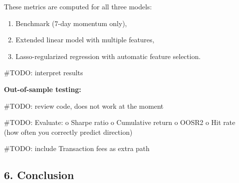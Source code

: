 \documentclass[
  12pt,
]{article}
\begin{document}
These metrics are computed for all three models:

\begin{enumerate}
  \item Benchmark (7-day momentum only),
  \item Extended linear model with multiple features,
  \item Lasso-regularized regression with automatic feature selection.
\end{enumerate}

\#TODO: interpret results

\textbf{Out-of-sample testing:}

\#TODO: review code, does not work at the moment

\#TODO: Evaluate: o Sharpe ratio o Cumulative return o OOSR2 o Hit rate
(how often you correctly predict direction)

\#TODO: include Transaction fees as extra path

\subsection{6. Conclusion}\label{conclusion}
\end{document}
